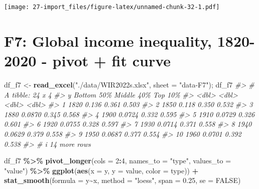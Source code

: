 \documentclass[
  xelatex, ja=standard]{bxjsbook}
\newenvironment{Shaded}{\begin{snugshade}}{\end{snugshade}}
\newcommand{\AttributeTok}[1]{\textcolor[rgb]{0.13,0.29,0.53}{#1}}
\newcommand{\CommentTok}[1]{\textcolor[rgb]{0.56,0.35,0.01}{\textit{#1}}}
\newcommand{\ConstantTok}[1]{\textcolor[rgb]{0.56,0.35,0.01}{#1}}
\newcommand{\DecValTok}[1]{\textcolor[rgb]{0.00,0.00,0.81}{#1}}
\newcommand{\FloatTok}[1]{\textcolor[rgb]{0.00,0.00,0.81}{#1}}
\newcommand{\FunctionTok}[1]{\textcolor[rgb]{0.13,0.29,0.53}{\textbf{#1}}}
\newcommand{\NormalTok}[1]{#1}
\newcommand{\OtherTok}[1]{\textcolor[rgb]{0.56,0.35,0.01}{#1}}
\newcommand{\SpecialCharTok}[1]{\textcolor[rgb]{0.81,0.36,0.00}{\textbf{#1}}}
\newcommand{\StringTok}[1]{\textcolor[rgb]{0.31,0.60,0.02}{#1}}
\theoremstyle{definition}
\theoremstyle{definition}
\theoremstyle{definition}
\theoremstyle{definition}
\theoremstyle{remark}
\begin{document}
\texttt{[image: 27-import\_files/figure-latex/unnamed-chunk-32-1.pdf]}

\hypertarget{f7-global-income-inequality-1820-2020---pivot-fit-curve}{%
\section{F7: Global income inequality, 1820-2020 - pivot + fit curve}\label{f7-global-income-inequality-1820-2020---pivot-fit-curve}}

\begin{Shaded}
\begin{Highlighting}[]
\NormalTok{df\_f7 }\OtherTok{\textless{}{-}} \FunctionTok{read\_excel}\NormalTok{(}\StringTok{"./data/WIR2022s.xlsx"}\NormalTok{, }\AttributeTok{sheet =} \StringTok{"data{-}F7"}\NormalTok{); df\_f7}
\CommentTok{\#\textgreater{} \# A tibble: 24 x 4}
\CommentTok{\#\textgreater{}        y \textasciigrave{}Bottom 50\%\textasciigrave{} \textasciigrave{}Middle 40\%\textasciigrave{} \textasciigrave{}Top 10\%\textasciigrave{}}
\CommentTok{\#\textgreater{}    \textless{}dbl\textgreater{}        \textless{}dbl\textgreater{}        \textless{}dbl\textgreater{}     \textless{}dbl\textgreater{}}
\CommentTok{\#\textgreater{}  1  1820       0.136         0.361     0.503}
\CommentTok{\#\textgreater{}  2  1850       0.118         0.350     0.532}
\CommentTok{\#\textgreater{}  3  1880       0.0870        0.345     0.568}
\CommentTok{\#\textgreater{}  4  1900       0.0724        0.332     0.595}
\CommentTok{\#\textgreater{}  5  1910       0.0729        0.326     0.601}
\CommentTok{\#\textgreater{}  6  1920       0.0755        0.328     0.597}
\CommentTok{\#\textgreater{}  7  1930       0.0714        0.371     0.558}
\CommentTok{\#\textgreater{}  8  1940       0.0629        0.379     0.558}
\CommentTok{\#\textgreater{}  9  1950       0.0687        0.377     0.554}
\CommentTok{\#\textgreater{} 10  1960       0.0701        0.392     0.538}
\CommentTok{\#\textgreater{} \# i 14 more rows}
\end{Highlighting}
\end{Shaded}

\begin{Shaded}
\begin{Highlighting}[]
\NormalTok{df\_f7 }\SpecialCharTok{\%\textgreater{}\%} 
  \FunctionTok{pivot\_longer}\NormalTok{(}\AttributeTok{cols =} \DecValTok{2}\SpecialCharTok{:}\DecValTok{4}\NormalTok{, }\AttributeTok{names\_to =} \StringTok{"type"}\NormalTok{, }\AttributeTok{values\_to =} \StringTok{"value"}\NormalTok{) }\SpecialCharTok{\%\textgreater{}\%}
  \FunctionTok{ggplot}\NormalTok{(}\FunctionTok{aes}\NormalTok{(}\AttributeTok{x =}\NormalTok{ y, }\AttributeTok{y =}\NormalTok{ value, }\AttributeTok{color =}\NormalTok{ type)) }\SpecialCharTok{+}
  \FunctionTok{stat\_smooth}\NormalTok{(}\AttributeTok{formula =}\NormalTok{ y}\SpecialCharTok{\textasciitilde{}}\NormalTok{x, }\AttributeTok{method =} \StringTok{"loess"}\NormalTok{, }\AttributeTok{span =} \FloatTok{0.25}\NormalTok{, }\AttributeTok{se =} \ConstantTok{FALSE}\NormalTok{)}
\end{Highlighting}
\end{Shaded}
\end{document}
